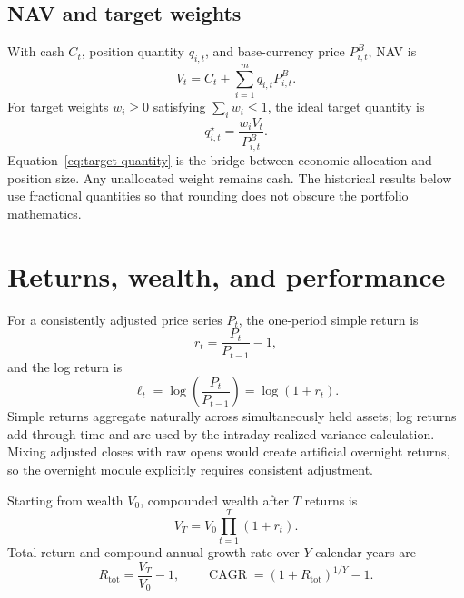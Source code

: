 \documentclass[11pt]{article}
\begin{document}
\subsection{NAV and target weights}

With cash $C_t$, position quantity $q_{i,t}$, and base-currency price $P_{i,t}^{B}$, NAV is
\begin{equation}
 V_t=C_t+\sum_{i=1}^{m}q_{i,t}P_{i,t}^{B}.
 \label{eq:nav}
\end{equation}
For target weights $w_i\geq 0$ satisfying $\sum_i w_i\leq 1$, the ideal target quantity is
\begin{equation}
 q_{i,t}^{\star}=\frac{w_iV_t}{P_{i,t}^{B}}.
 \label{eq:target-quantity}
\end{equation}
Equation~\eqref{eq:target-quantity} is the bridge between economic allocation and position size.
Any unallocated weight remains cash. The historical results below use fractional quantities so
that rounding does not obscure the portfolio mathematics.

\section{Returns, wealth, and performance}\label{sec:performance}

For a consistently adjusted price series $P_t$, the one-period simple return is
\begin{equation}
 r_t=\frac{P_t}{P_{t-1}}-1,
 \label{eq:simple-return}
\end{equation}
and the log return is
\begin{equation}
 \ell_t=\log\!\left(\frac{P_t}{P_{t-1}}\right)=\log(1+r_t).
 \label{eq:log-return}
\end{equation}
Simple returns aggregate naturally across simultaneously held assets; log returns add through
time and are used by the intraday realized-variance calculation. Mixing adjusted closes with raw
opens would create artificial overnight returns, so the overnight module explicitly requires
consistent adjustment.

Starting from wealth $V_0$, compounded wealth after $T$ returns is
\begin{equation}
 V_T=V_0\prod_{t=1}^{T}(1+r_t).
 \label{eq:wealth}
\end{equation}
Total return and compound annual growth rate over $Y$ calendar years are
\begin{equation}
 R_{\mathrm{tot}}=\frac{V_T}{V_0}-1,
 \qquad
 \operatorname{CAGR}=\left(1+R_{\mathrm{tot}}\right)^{1/Y}-1.
 \label{eq:cagr}
\end{equation}
\end{document}
